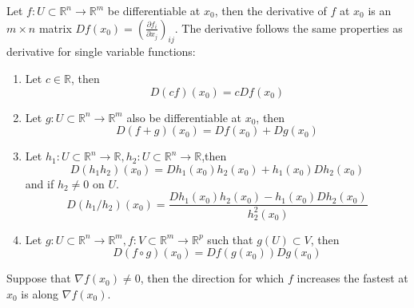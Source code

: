 \documentclass[openany]{book}
\newcommand{\R}{\mathbb{R}}
\begin{document}
\begin{prop}
    Let $f:U\subset\R^n\to\R^m$ be differentiable at $x_0$, then the derivative of $f$ at $x_0$ is an $m\times n$ matrix $Df(x_0)=\left(\frac{\partial f_i}{\partial x_j}\right)_{ij}$. The derivative follows the same properties as derivative for single variable functions:
    \begin{enumerate}
        \item Let $c\in\R$, then 
        \begin{equation*}
            D(cf)(x_0)=cDf(x_0) \tag {multiplication of a matrix by constant $c$}
        \end{equation*}
        \item Let $g: U\subset\R^n\to\R^m$ also be differentiable at $x_0$, then 
        \begin{equation*}
            D(f+g)(x_0)=Df(x_0)+Dg(x_0) \tag{sum of two matrices}
        \end{equation*}
        \item Let $h_1: U\subset\R^n\to\R, h_2: U\subset\R^n\to\R$,then 
        \begin{equation*}
            D(h_1h_2)(x_0)=Dh_1(x_0)h_2(x_0)+h_1(x_0)Dh_2(x_0) \tag{product rule}
        \end{equation*}
        and if $h_2\neq 0$ on $U$.
        \begin{equation*}
            D(h_1/h_2)(x_0)=\frac{Dh_1(x_0)h_2(x_0)-h_1(x_0)Dh_2(x_0)}{h_2^2(x_0)} \tag{quotient rule}
        \end{equation*}
        \item Let $g: U\subset\R^n\to\R^m, f:V\subset\R^m\to\R^p$ such that $g(U)\subset V$, then 
        \begin{equation*}
            D(f\circ g)(x_0)=Df(g(x_0))Dg(x_0) \tag{chain rule}
        \end{equation*}
    \end{enumerate}
\end{prop}



\begin{prop}
    Suppose that $\nabla f(x_0)\neq 0$, then the direction for which $f$ increases the fastest at $x_0$ is along $\nabla f(x_0)$.
\end{prop}
\end{document}
